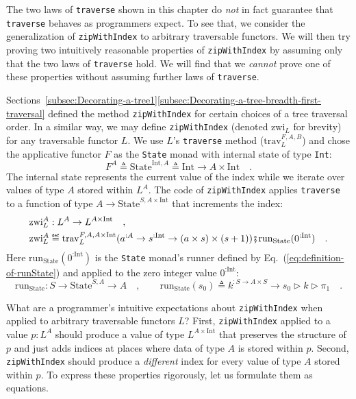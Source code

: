 The two laws of \lstinline!traverse! shown in this chapter do \emph{not}
in fact guarantee that \lstinline!traverse! behaves as programmers
expect. To see that, we consider the generalization of \lstinline!zipWithIndex!
to arbitrary traversable functors. We will then try proving two intuitively
reasonable properties of \lstinline!zipWithIndex! by assuming only
that the two laws of \lstinline!traverse! hold. We will find that
we \emph{cannot} prove one of these properties without assuming further
laws of \lstinline!traverse!.

Sections~\ref{subsec:Decorating-a-tree1}\textendash \ref{subsec:Decorating-a-tree-breadth-first-traversal}
defined the method \lstinline!zipWithIndex! for certain choices of
a tree traversal order. In a similar way, we may define \lstinline!zipWithIndex!
(denoted $\text{zwi}_{L}$ for brevity) for any traversable functor
$L$. We use $L$\textsf{'}s \lstinline!traverse! method ($\text{trav}_{L}^{F,A,B}$)
and chose the applicative functor $F$ as the \lstinline!State! monad
with internal state of type \lstinline!Int!:
\[
F^{A}\triangleq\text{State}^{\text{Int},A}\triangleq\text{Int}\rightarrow A\times\text{Int}\quad.
\]
The internal state represents the current value of the index while
we iterate over values of type $A$ stored within $L^{A}$. The code
of \lstinline!zipWithIndex! applies \lstinline!traverse! to a function
of type $A\rightarrow\text{State}^{S,A\times\text{Int}}$ that increments
the index:
\begin{align}
 & \text{zwi}_{L}^{A}:L^{A}\rightarrow L^{A\times\text{Int}}\quad,\nonumber \\
 & \text{zwi}_{L}^{A}\triangleq\text{trav}_{L}^{F,A,A\times\text{Int}}(a^{:A}\rightarrow s^{:\text{Int}}\rightarrow(a\times s)\times(s+1))\bef\text{run}_{\text{State}}(0^{:\text{Int}})\quad.\label{eq:definition-of-zwi}
\end{align}
Here $\text{run}_{\text{State}}(0^{:\text{Int}})$ is the \lstinline!State!
monad\textsf{'}s runner defined by Eq.~(\ref{eq:definition-of-runState})
and applied to the zero integer value $0^{:\text{Int}}$:
\[
\text{run}_{\text{State}}:S\rightarrow\text{State}^{S,A}\rightarrow A\quad,\quad\quad\text{run}_{\text{State}}(s_{0})\triangleq k^{:S\rightarrow A\times S}\rightarrow s_{0}\triangleright k\triangleright\pi_{1}\quad.
\]

What are a programmer\textsf{'}s intuitive expectations about \lstinline!zipWithIndex!
when applied to arbitrary traversable functors $L$? First, \lstinline!zipWithIndex!
applied to a value $p:L^{A}$ should produce a value of type $L^{A\times\text{Int}}$
that preserves the structure of $p$ and just adds indices at places
where data of type $A$ is stored within $p$. Second, \lstinline!zipWithIndex!
should produce a \emph{different} index for every value of type $A$
stored within $p$. To express these properties rigorously, let us
formulate them as equations.

